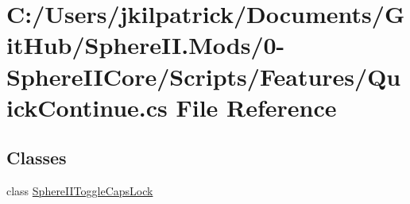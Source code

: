 \hypertarget{0-_sphere_i_i_core_2_scripts_2_features_2_quick_continue_8cs}{}\section{C\+:/\+Users/jkilpatrick/\+Documents/\+Git\+Hub/\+Sphere\+II.Mods/0-\/\+Sphere\+I\+I\+Core/\+Scripts/\+Features/\+Quick\+Continue.cs File Reference}
\label{0-_sphere_i_i_core_2_scripts_2_features_2_quick_continue_8cs}
\subsection*{Classes}
\begin{DoxyCompactItemize}
\item 
class \mbox{\hyperlink{class_sphere_i_i_toggle_caps_lock}{Sphere\+I\+I\+Toggle\+Caps\+Lock}}
\end{DoxyCompactItemize}
